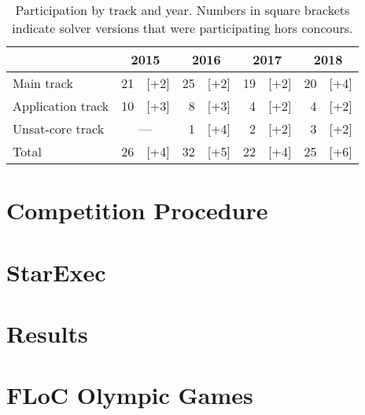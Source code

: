 \documentclass[twoside,11pt]{article}
\begin{document}
\begin{table}
  \caption{Participation by track and year.  Numbers in square
    brackets indicate solver versions that were participating hors
    concours.}
  \label{table:participation-by-track}
  \centering
  \begin{tabular}{|l|r@{\,\,}r|r@{\,\,}r|r@{\,\,}r|r@{\,\,}r|}
    \hline
                      & \multicolumn{2}{c|}{2015} & \multicolumn{2}{c|}{2016} & \multicolumn{2}{c|}{2017} & \multicolumn{2}{c|}{2018} \\
    \hline
    Main track        & 21 &                [+2] & 25 & [+2] & 19 & [+2] & 20 & [+4] \\
    Application track & 10 &                [+3] &  8 & [+3] &  4 & [+2] &  4 & [+2] \\
    Unsat-core track  & \multicolumn{2}{c|}{---} &  1 & [+4] &  2 & [+2] &  3 & [+2] \\
    \hline
    Total             & 26 &                [+4] & 32 & [+5] & 22 & [+4] & 25 & [+6] \\
    \hline
  \end{tabular}
\end{table}


\section{Competition Procedure}
\label{sec:procedure}


\section{StarExec}
\label{sec:starexec}


\section{Results}
\label{sec:results}


\section{FLoC Olympic Games}
\label{sec:floc}
\end{document}
